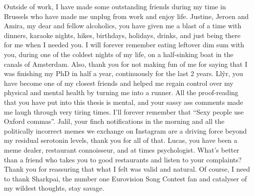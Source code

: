 Outside of work, I have made some outstanding friends during my time in Brussels who have made me unplug from work and enjoy life. Justine, Jeroen and Amira, my dear and fellow alcoholics, you have given me a blast of a time with dinners, karaoke nights, hikes, birthdays, holidays, drinks, and just being there for me when I needed you. I will forever remember eating leftover dim sum with you, during one of the coldest nights of my life, on a half-sinking boat in the canals of Amsterdam. Also, thank you for not making fun of me for saying that I was finishing my PhD in half a year, continuously for the last 2 years. Llŷr, you have become one of my closest friends and helped me regain control over my physical and mental health by turning me into a runner. All the proof-reading that you have put into this thesis is mental, and your sassy ass comments made me laugh through very tiring times. I'll forever remember that ``Sexy people use Oxford commas''. Jalil, your finch notifications in the morning and all the politically incorrect memes we exchange on Instagram are a driving force beyond my residual serotonin levels, thank you for all of that. Lucas, you have been a meme dealer, restaurant connoisseur, and at times psychologist. What's better than a friend who takes you to good restaurants and listen to your complaints? Thank you for reassuring that what I felt was valid and natural. Of course, I need to thank Sharkpai, the number one Eurovision Song Contest fan and catalyser of my wildest thoughts, stay savage.

